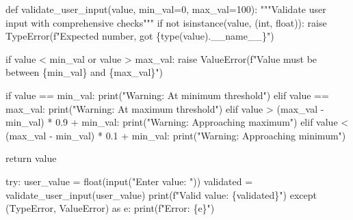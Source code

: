 \documentclass[
  letterpaper,
  DIV=11,
  numbers=noendperiod,
  oneside]{scrreprt}
\newenvironment{Shaded}{}{}
\newcommand{\BuiltInTok}[1]{\textcolor[rgb]{0.84,0.23,0.29}{#1}}
\newcommand{\CommentTok}[1]{\textcolor[rgb]{0.42,0.45,0.49}{#1}}
\newcommand{\ControlFlowTok}[1]{\textcolor[rgb]{0.84,0.23,0.29}{#1}}
\newcommand{\DecValTok}[1]{\textcolor[rgb]{0.00,0.36,0.77}{#1}}
\newcommand{\FloatTok}[1]{\textcolor[rgb]{0.00,0.36,0.77}{#1}}
\newcommand{\ImportTok}[1]{\textcolor[rgb]{0.01,0.18,0.38}{#1}}
\newcommand{\KeywordTok}[1]{\textcolor[rgb]{0.84,0.23,0.29}{#1}}
\newcommand{\NormalTok}[1]{\textcolor[rgb]{0.14,0.16,0.18}{#1}}
\newcommand{\OperatorTok}[1]{\textcolor[rgb]{0.14,0.16,0.18}{#1}}
\newcommand{\PreprocessorTok}[1]{\textcolor[rgb]{0.84,0.23,0.29}{#1}}
\newcommand{\SpecialCharTok}[1]{\textcolor[rgb]{0.00,0.36,0.77}{#1}}
\newcommand{\SpecialStringTok}[1]{\textcolor[rgb]{0.01,0.18,0.38}{#1}}
\newcommand{\StringTok}[1]{\textcolor[rgb]{0.01,0.18,0.38}{#1}}
\newcommand{\VariableTok}[1]{\textcolor[rgb]{0.89,0.38,0.04}{#1}}
\begin{document}
\begin{Shaded}
\begin{Highlighting}[]
\KeywordTok{def}\NormalTok{ validate\_user\_input(value, min\_val}\OperatorTok{=}\DecValTok{0}\NormalTok{, max\_val}\OperatorTok{=}\DecValTok{100}\NormalTok{):}
    \CommentTok{"""Validate user input with comprehensive checks"""}
    \ControlFlowTok{if} \KeywordTok{not} \BuiltInTok{isinstance}\NormalTok{(value, (}\BuiltInTok{int}\NormalTok{, }\BuiltInTok{float}\NormalTok{)):}
        \ControlFlowTok{raise} \PreprocessorTok{TypeError}\NormalTok{(}\SpecialStringTok{f"Expected number, got }\SpecialCharTok{\{}\BuiltInTok{type}\NormalTok{(value)}\SpecialCharTok{.}\VariableTok{\_\_name\_\_}\SpecialCharTok{\}}\SpecialStringTok{"}\NormalTok{)}
    
    \ControlFlowTok{if}\NormalTok{ value }\OperatorTok{\textless{}}\NormalTok{ min\_val }\KeywordTok{or}\NormalTok{ value }\OperatorTok{\textgreater{}}\NormalTok{ max\_val:}
        \ControlFlowTok{raise} \PreprocessorTok{ValueError}\NormalTok{(}\SpecialStringTok{f"Value must be between }\SpecialCharTok{\{}\NormalTok{min\_val}\SpecialCharTok{\}}\SpecialStringTok{ and }\SpecialCharTok{\{}\NormalTok{max\_val}\SpecialCharTok{\}}\SpecialStringTok{"}\NormalTok{)}
    
    \ControlFlowTok{if}\NormalTok{ value }\OperatorTok{==}\NormalTok{ min\_val:}
        \BuiltInTok{print}\NormalTok{(}\StringTok{"Warning: At minimum threshold"}\NormalTok{)}
    \ControlFlowTok{elif}\NormalTok{ value }\OperatorTok{==}\NormalTok{ max\_val:}
        \BuiltInTok{print}\NormalTok{(}\StringTok{"Warning: At maximum threshold"}\NormalTok{)}
    \ControlFlowTok{elif}\NormalTok{ value }\OperatorTok{\textgreater{}}\NormalTok{ (max\_val }\OperatorTok{{-}}\NormalTok{ min\_val) }\OperatorTok{*} \FloatTok{0.9} \OperatorTok{+}\NormalTok{ min\_val:}
        \BuiltInTok{print}\NormalTok{(}\StringTok{"Warning: Approaching maximum"}\NormalTok{)}
    \ControlFlowTok{elif}\NormalTok{ value }\OperatorTok{\textless{}}\NormalTok{ (max\_val }\OperatorTok{{-}}\NormalTok{ min\_val) }\OperatorTok{*} \FloatTok{0.1} \OperatorTok{+}\NormalTok{ min\_val:}
        \BuiltInTok{print}\NormalTok{(}\StringTok{"Warning: Approaching minimum"}\NormalTok{)}
    
    \ControlFlowTok{return}\NormalTok{ value}

\ControlFlowTok{try}\NormalTok{:}
\NormalTok{    user\_value }\OperatorTok{=} \BuiltInTok{float}\NormalTok{(}\BuiltInTok{input}\NormalTok{(}\StringTok{"Enter value: "}\NormalTok{))}
\NormalTok{    validated }\OperatorTok{=}\NormalTok{ validate\_user\_input(user\_value)}
    \BuiltInTok{print}\NormalTok{(}\SpecialStringTok{f"Valid value: }\SpecialCharTok{\{}\NormalTok{validated}\SpecialCharTok{\}}\SpecialStringTok{"}\NormalTok{)}
\ControlFlowTok{except}\NormalTok{ (}\PreprocessorTok{TypeError}\NormalTok{, }\PreprocessorTok{ValueError}\NormalTok{) }\ImportTok{as}\NormalTok{ e:}
    \BuiltInTok{print}\NormalTok{(}\SpecialStringTok{f"Error: }\SpecialCharTok{\{}\NormalTok{e}\SpecialCharTok{\}}\SpecialStringTok{"}\NormalTok{)}
\end{Highlighting}
\end{Shaded}
\end{document}
